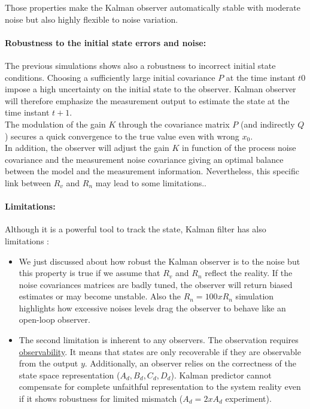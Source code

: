 Those properties make the Kalman observer automatically stable with moderate noise but also highly flexible to noise variation.

\paragraph{Robustness to the initial state errors and noise:}

The previous simulations shows also a robustness to incorrect initial state conditions.  Choosing a sufficiently large initial covariance $P$ at the time instant $t0$ impose a high uncertainty on the initial state to the observer. Kalman observer will therefore emphasize the measurement output to estimate the state at the time instant $t+1$.\\
The modulation of the gain $K$ through the covariance matrix $P$ (and indirectly $Q$) secures a quick convergence to the true value even with wrong $x_0$.\\
In addition, the observer will adjust the gain $K$ in function of the process noise covariance and the measurement noise covariance giving an optimal balance between the model and the measurement information. Nevertheless, this specific link between $R_v$ and $R_n$ may lead to some 
limitations..

\paragraph{Limitations:}

Although it is a powerful tool to track the state, Kalman filter has also limitations :

\begin{itemize}
    \item We just discussed about how robust the Kalman observer is to the noise but this property is true if we assume that $R_v$ and $R_n$ reflect the reality.  If the noise covariances matrices are badly tuned, the observer will return biased estimates or may become unstable.
          Also the $R_n = 100 x R_n$ simulation highlights how excessive noises levels drag the observer to behave like an open-loop observer.
    \item The second limitation is inherent to any observers.  The observation requires \underline{observability}.  It means that states are only recoverable if they are observable from the output $y$. Additionally, an observer relies on the correctness of the state space representation ($A_d, B_d, C_d, D_d$).
          Kalman predictor cannot compensate for complete unfaithful representation to the system reality even if it shows robustness for limited mismatch ($A_d = 2 x A_d$ experiment).
\end{itemize}

